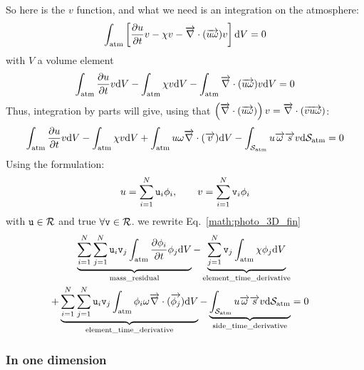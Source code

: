 So here is the $v$ function, and what we need is an integration on
the atmosphere:
\begin{equation}
\int_{\text{atm}}\left[\frac{\partial u}{\partial t}v - \chi v - \overrightarrow{\nabla}\cdot(\overrightarrow{u\omega}) v\right] \mathrm{d} V = 0
\label{math:solve:3D_photo}
\end{equation}
with $V$ a volume element
\begin{equation}
  \int_{\text{atm}}\frac{\partial u}{\partial t}v\mathrm{d} V 
- \int_{\text{atm}}\chi v \mathrm{d} V 
- \int_{\text{atm}}\overrightarrow{\nabla}\cdot(\overrightarrow{u\omega})v \mathrm{d} V  = 0
\label{math:photo_3D_start}
\end{equation}
Thus, integration by parts will give,
using that $\left(\overrightarrow{\nabla}\cdot(\overrightarrow{u\omega})\right) v = \overrightarrow{\nabla}\cdot(\overrightarrow{vu\omega})$:
\begin{equation}
  \int_{\text{atm}}\frac{\partial u}{\partial t}v\mathrm{d} V
- \int_{\text{atm}}\chi v \mathrm{d} V 
+ \int_{\text{atm}} u\omega \overrightarrow{\nabla}\cdot(\overrightarrow{v}) \mathrm{d} V 
- \int_{\mathcal{S}_\text{atm}} u\overrightarrow{\omega}\overrightarrow{s}v {\mathrm{d}\mathcal{S}_\text{atm}} = 0
\label{math:photo_3D_fin}
\end{equation}
Using the formulation:
\begin{equation}
u = \sum_{i=1}^N \mathtt{u}_i \phi_i,\qquad v = \sum_{i=1}^N\mathtt{v}_i \phi_i
\end{equation}
with $\mathtt{u} \in \mathcal{R}$ and true $\forall \mathtt{v} \in \mathcal{R}$. 
we rewrite Eq.~\ref{math:photo_3D_fin}
\begin{equation}
\begin{split}
  \underbrace{\sum_{i=1}^N\sum_{j=1}^N\mathtt{u}_i\mathtt{v}_j\int_{\text{atm}}\frac{\partial\phi_i}{\partial t}\phi_j\mathrm{d} V}_{\text{mass\_residual}}
- \underbrace{\sum_{j=1}^N\mathtt{v}_j\int_{\text{atm}}\chi \phi_j \mathrm{d} V}_\text{element\_time\_derivative} \\
+ \underbrace{\sum_{i=1}^N\sum_{j=1}^N\mathtt{u}_i\mathtt{v}_j\int_{\text{atm}} \phi_i\omega \overrightarrow{\nabla}\cdot(\overrightarrow{\phi_j}) \mathrm{d} V}_\text{element\_time\_derivative}
- \underbrace{\int_{\mathcal{S}_\text{atm}} u\overrightarrow{\omega}\overrightarrow{s}v {\mathrm{d}\mathcal{S}_\text{atm}}}_\text{side\_time\_derivative} & = 0
\end{split}
\end{equation}

\subsubsection{In one dimension}

